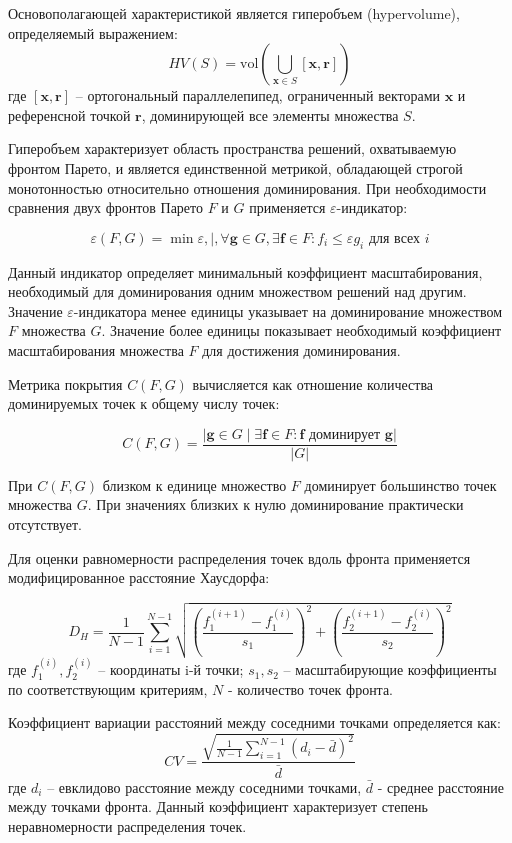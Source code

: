 Основополагающей характеристикой является гиперобъем (hypervolume), определяемый выражением:
$$HV(S) = \mathrm{vol} \left(\bigcup_{\mathbf{x} \in S} [\mathbf{x}, \mathbf{r}]\right)$$
где $[\mathbf{x}, \mathbf{r}]$ -- ортогональный параллелепипед, ограниченный векторами $\mathbf{x}$ и референсной точкой $\mathbf{r}$, доминирующей все элементы множества $S$. 

Гиперобъем характеризует область пространства решений, охватываемую фронтом Парето, и является единственной метрикой, обладающей строгой монотонностью относительно отношения доминирования.
При необходимости сравнения двух фронтов Парето $F$ и $G$ применяется $\varepsilon$-индикатор:

$$\varepsilon(F, G) = \min { \varepsilon ,|, \forall \mathbf{g} \in G, \exists \mathbf{f} \in F : f_i \le \varepsilon g_i \text{ для всех } i }$$

Данный индикатор определяет минимальный коэффициент масштабирования, необходимый для доминирования одним множеством решений над другим.
Значение $\varepsilon$-индикатора менее единицы указывает на доминирование множеством $F$ множества $G$. Значение более единицы показывает необходимый коэффициент масштабирования множества $F$ для достижения доминирования.

Метрика покрытия $C(F,G)$ вычисляется как отношение количества доминируемых точек к общему числу точек:

$$C(F,G) = \frac{|{\mathbf{g} \in G \mid \exists \mathbf{f}\in F : \mathbf{f} \text{ доминирует } \mathbf{g} }|}{|G|}$$

При $C(F,G)$ близком к единице множество $F$ доминирует большинство точек множества $G$. При значениях близких к нулю доминирование практически отсутствует.

Для оценки равномерности распределения точек вдоль фронта применяется модифицированное расстояние Хаусдорфа:

$$D_H = \frac{1}{N-1}\sum_{i=1}^{N-1} \sqrt{\left(\frac{f_1^{(i+1)} - f_1^{(i)}}{s_1}\right)^2 + \left(\frac{f_2^{(i+1)} - f_2^{(i)}}{s_2}\right)^2}$$
где $f_1^{(i)}, f_2^{(i)}$ -- координаты i-й точки;
$s_1, s_2$ -- масштабирующие коэффициенты по соответствующим критериям, $N$ - количество точек фронта.

Коэффициент вариации расстояний между соседними точками определяется как:
$$CV = \frac{\sqrt{\frac{1}{N-1}\sum_{i=1}^{N-1}(d_i - \bar{d})^2}}{\bar{d}}$$
где $d_i$ -- евклидово расстояние между соседними точками, $\bar{d}$ - среднее расстояние между точками фронта.
Данный коэффициент характеризует степень неравномерности распределения точек.

